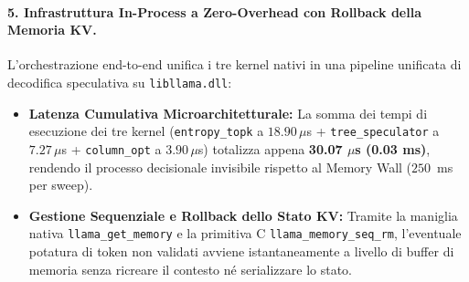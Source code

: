 \documentclass[10pt,a4paper]{article}
\theoremstyle{definition}
\begin{document}
\paragraph{5. Infrastruttura In-Process a Zero-Overhead con Rollback della Memoria KV.}
L'orchestrazione end-to-end unifica i tre kernel nativi in una pipeline unificata di decodifica speculativa su \texttt{libllama.dll}:
\begin{itemize}[leftmargin=1.5em]
    \item \textbf{Latenza Cumulativa Microarchitetturale:} La somma dei tempi di esecuzione dei tre kernel (\texttt{entropy\_topk} a $18.90\,\mu$s + \texttt{tree\_speculator} a $7.27\,\mu$s + \texttt{column\_opt} a $3.90\,\mu$s) totalizza appena \textbf{30.07 $\mu$s (0.03 ms)}, rendendo il processo decisionale invisibile rispetto al Memory Wall ($250$~ms per sweep).
    \item \textbf{Gestione Sequenziale e Rollback dello Stato KV:} Tramite la maniglia nativa \texttt{llama\_get\_memory} e la primitiva C \texttt{llama\_memory\_seq\_rm}, l'eventuale potatura di token non validati avviene istantaneamente a livello di buffer di memoria senza ricreare il contesto né serializzare lo stato.
\end{itemize}
\end{document}
